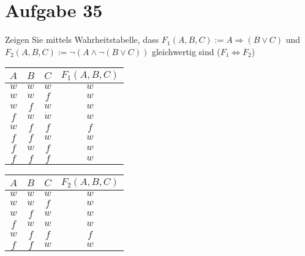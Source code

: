 \section{Aufgabe 35}
\setcounter{section}{35}

Zeigen Sie mittels Wahrheitstabelle, dass $F_1(A, B, C) := A \Rightarrow (B
\lor C)$ und $F_2(A, B, C) := \lnot(A \land \lnot(B \lor C))$ gleichwertig sind
($F_1 \Leftrightarrow F_2$)

\begin{table*}[h]
    \centering
    \begin{minipage}{.4\linewidth}
        \centering
        \begin{tabular}{|c|c|c|c|}
            \hline
            $A$ & $B$ & $C$ & $F_1(A, B, C)$ \\
            \hline
            $w$ & $w$ & $w$ & $w$ \\
            \hline
            $w$ & $w$ & $f$ & $w$ \\
            \hline
            $w$ & $f$ & $w$ & $w$ \\
            \hline
            $f$ & $w$ & $w$ & $w$ \\
            \hline
            $w$ & $f$ & $f$ & $f$ \\
            \hline
            $f$ & $f$ & $w$ & $w$ \\
            \hline
            $f$ & $w$ & $f$ & $w$ \\
            \hline
            $f$ & $f$ & $f$ & $w$ \\
            \hline
        \end{tabular}
    \end{minipage}%
    \begin{minipage}{.4\linewidth}
        \centering
        \begin{tabular}{|c|c|c|c|}
            \hline
            $A$ & $B$ & $C$ & $F_2(A, B, C)$ \\
            \hline
            $w$ & $w$ & $w$ & $w$ \\
            \hline
            $w$ & $w$ & $f$ & $w$ \\
            \hline
            $w$ & $f$ & $w$ & $w$ \\
            \hline
            $f$ & $w$ & $w$ & $w$ \\
            \hline
            $w$ & $f$ & $f$ & $f$ \\
            \hline
            $f$ & $f$ & $w$ & $w$ \\
            \hline

\end{tabular}
\end{minipage}
\end{table*}
